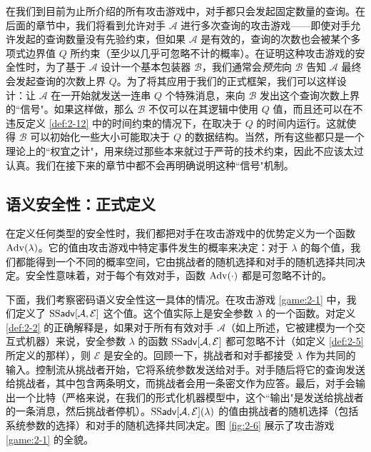 \begin{snote}[查询有界的对手。]
在我们到目前为止所介绍的所有攻击游戏中，对手都只会发起固定数量的查询。在后面的章节中，我们将看到允许对手 $\mathcal{A}$ 进行多次查询的攻击游戏——即使对手允许发起的查询数量没有先验约束，但如果 $\mathcal{A}$ 是有效的，查询的次数也会被某个多项式边界值 $Q$ 所约束（至少以几乎可忽略不计的概率）。在证明这种攻击游戏的安全性时，为了基于 $\mathcal{A}$ 设计一个基本包装器 $\mathcal{B}$，我们通常会\emph{预先}向 $\mathcal{B}$ 告知 $\mathcal{A}$ 最终会发起查询的次数上界 $Q$。为了将其应用于我们的正式框架，我们可以这样设计：让 $\mathcal{A}$ 在一开始就发送一连串 $Q$ 个特殊消息，来向 $\mathcal{B}$ 发出这个查询次数上界的``信号"。如果这样做，那么 $\mathcal{B}$ 不仅可以在其逻辑中使用 $Q$ 值，而且还可以在不违反定义 \ref{def:2-12} 中的时间约束的情况下，在取决于 $Q$ 的时间内运行。这就使得 $\mathcal{B}$ 可以初始化一些大小可能取决于 $Q$ 的数据结构。当然，所有这些都只是一个理论上的``权宜之计"，用来绕过那些本来就过于严苛的技术约束，因此不应该太过认真。我们在接下来的章节中都不会再明确说明这种``信号"机制。
\end{snote}


\subsection{语义安全性：正式定义}

在定义任何类型的安全性时，我们都把对手在攻击游戏中的优势定义为一个函数 ${\rm Adv}(\lambda)$。它的值由攻击游戏中特定事件发生的概率来决定：对于 $\lambda$ 的每个值，我们都能得到一个不同的概率空间，它由挑战者的随机选择和对手的随机选择共同决定。安全性意味着，对于每个有效对手，函数 ${\rm Adv}(\cdot)$ 都是可忽略不计的。

下面，我们考察密码语义安全性这一具体的情况。在攻击游戏 \ref{game:2-1} 中，我们定义了 ${\rm SS\mathsf{adv}}[\mathcal{A},\mathcal{E}]$ 这个值。这个值实际上是安全参数 $\lambda$ 的一个函数。对定义 \ref{def:2-2} 的正确解释是，如果对于所有有效对手 $\mathcal{A}$（如上所述，它被建模为一个交互式机器）来说，安全参数 $\lambda$ 的函数 ${\rm SS\mathsf{adv}}[\mathcal{A},\mathcal{E}]$ 都可忽略不计（如定义 \ref{def:2-5} 所定义的那样），则 $\mathcal{E}$ 是安全的。回顾一下，挑战者和对手都接受 $\lambda$ 作为共同的输入。控制流从挑战者开始，它将系统参数发送给对手。对手随后将它的查询发送给挑战者，其中包含两条明文，而挑战者会用一条密文作为应答。最后，对手会输出一个比特（严格来说，在我们的形式化机器模型中，这个``输出"是发送给挑战者的一条消息，然后挑战者停机）。${\rm SS\mathsf{adv}}[\mathcal{A},\mathcal{E}](\lambda)$ 的值由挑战者的随机选择（包括系统参数的选择）和对手的随机选择共同决定。图 \ref{fig:2-6} 展示了攻击游戏 \ref{game:2-1} 的全貌。

